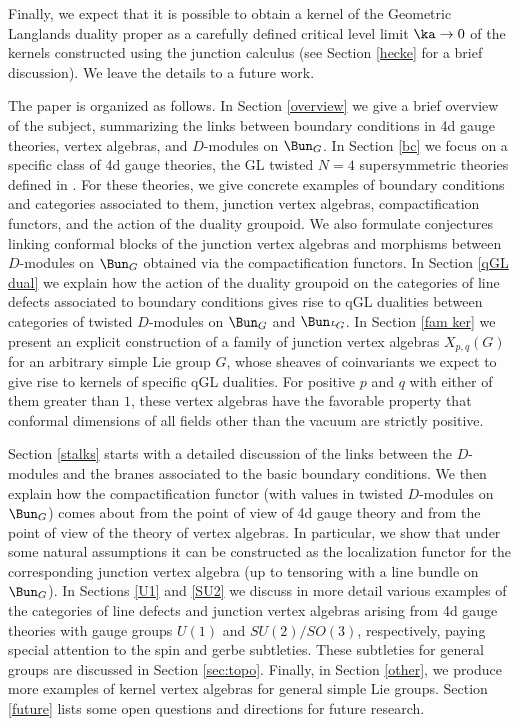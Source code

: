\documentclass[11pt,reqno]{amsart}
\theoremstyle{plain}
\numberwithin{equation}{section}
\def\neg{\negthinspace}
\def\LG{{}^L\neg G}
\theoremstyle{definition}
\begin{document}
Finally, we expect that it is possible to obtain a kernel of the
Geometric Langlands duality proper as a carefully defined critical
level limit $\ka \to 0$ of the kernels constructed using the junction
calculus (see Section \ref{hecke} for a brief discussion). We leave
the details to a future work.

\bigskip

The paper is organized as follows. In Section \ref{overview} we give a
brief overview of the subject, summarizing the links between boundary
conditions in 4d gauge theories, vertex algebras, and $D$-modules on
$\Bun_G$. In Section \ref{bc} we focus on a specific class of 4d gauge
theories, the GL twisted $N=4$ supersymmetric theories defined in
\cite{KW}. For these theories, we give concrete examples of boundary
conditions and categories associated to them, junction vertex
algebras, compactification functors, and the action of the duality
groupoid. We also formulate conjectures linking conformal blocks of
the junction vertex algebras and morphisms between $D$-modules on
$\Bun_G$ obtained via the compactification functors. In Section
\ref{qGL dual} we explain how the action of the duality groupoid on
the categories of line defects associated to boundary conditions gives
rise to qGL dualities between categories of twisted $D$-modules on
$\Bun_G$ and $\Bun_{\LG}$. In Section \ref{fam ker} we present an
explicit construction of a family of junction vertex algebras
$X_{p,q}(G)$ for an arbitrary simple Lie group $G$, whose sheaves of
coinvariants we expect to give rise to kernels of specific qGL
dualities. For positive $p$ and $q$ with either of them greater than
$1$, these vertex algebras have the favorable property that conformal
dimensions of all fields other than the vacuum are strictly positive.

Section \ref{stalks} starts with a detailed discussion of the links
between the $D$-modules and the branes associated to the basic
boundary conditions. We then explain how the compactification functor
(with values in twisted $D$-modules on $\Bun_G$) comes about from the
point of view of 4d gauge theory and from the point of view of the
theory of vertex algebras. In particular, we show that under some
natural assumptions it can be constructed as the localization functor
for the corresponding junction vertex algebra (up to tensoring with a
line bundle on $\Bun_G$). In Sections \ref{U1} and \ref{SU2} we
discuss in more detail various examples of the categories of line
defects and junction vertex algebras arising from 4d gauge theories
with gauge groups $U(1)$ and $SU(2)/SO(3)$, respectively, paying
special attention to the spin and gerbe subtleties. These subtleties
for general groups are discussed in Section \ref{sec:topo}. Finally,
in Section \ref{other}, we produce more examples of kernel vertex
algebras for general simple Lie groups. Section \ref{future} lists
some open questions and directions for future research.
\end{document}
